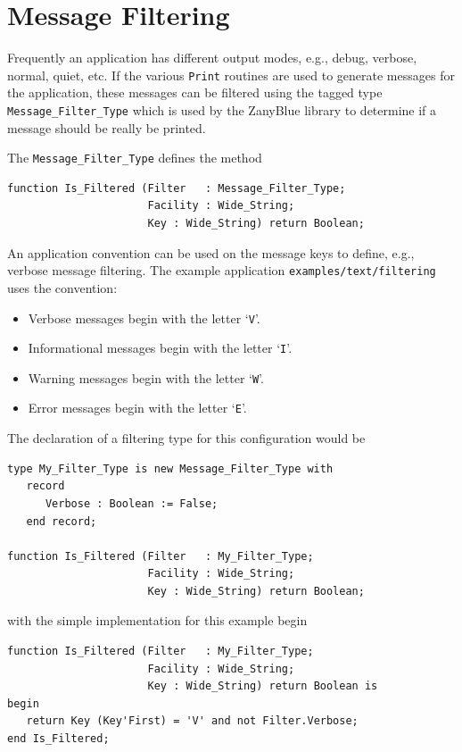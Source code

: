 \section{Message Filtering}

Frequently an application has different output modes, e.g., debug, verbose,
normal, quiet, etc.  If the various \texttt{Print} routines are used to
generate messages for the application, these messages can be filtered using
the tagged type \texttt{Message\_Filter\_Type} which is used by the ZanyBlue
library to determine if a message should be really be printed.

The \texttt{Message\_Filter\_Type} defines the method
\begin{xmpl}
\begin{verbatim}
function Is_Filtered (Filter   : Message_Filter_Type;
                      Facility : Wide_String;
                      Key : Wide_String) return Boolean;
\end{verbatim}
\end{xmpl}

An application convention can be used on the message keys to define, e.g.,
verbose message filtering.  The example application
\texttt{examples/text/filtering} uses the convention:
\begin{itemize}
\item Verbose messages begin with the letter `\texttt{V}'.
\item Informational messages begin with the letter `\texttt{I}'.
\item Warning messages begin with the letter `\texttt{W}'.
\item Error messages begin with the letter `\texttt{E}'.
\end{itemize}

The declaration of a filtering type for this configuration would be
\begin{xmpl}
\begin{verbatim}
type My_Filter_Type is new Message_Filter_Type with
   record
      Verbose : Boolean := False;
   end record;

function Is_Filtered (Filter   : My_Filter_Type;
                      Facility : Wide_String;
                      Key : Wide_String) return Boolean;
\end{verbatim}
\end{xmpl}
with the simple implementation for this example begin
\begin{xmpl}
\begin{verbatim}
function Is_Filtered (Filter   : My_Filter_Type;
                      Facility : Wide_String;
                      Key : Wide_String) return Boolean is
begin
   return Key (Key'First) = 'V' and not Filter.Verbose;
end Is_Filtered;
\end{verbatim}
\end{xmpl}

